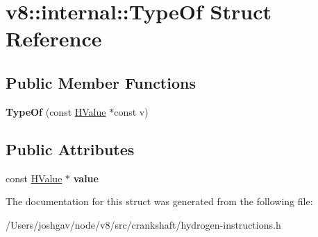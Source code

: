 \hypertarget{structv8_1_1internal_1_1_type_of}{}\section{v8\+:\+:internal\+:\+:Type\+Of Struct Reference}
\label{structv8_1_1internal_1_1_type_of}
\subsection*{Public Member Functions}
\begin{DoxyCompactItemize}
\item 
{\bfseries Type\+Of} (const \hyperlink{classv8_1_1internal_1_1_h_value}{H\+Value} $\ast$const v)\hypertarget{structv8_1_1internal_1_1_type_of_a1ba1a45c67d36246ba6075172ca12ee0}{}\label{structv8_1_1internal_1_1_type_of_a1ba1a45c67d36246ba6075172ca12ee0}

\end{DoxyCompactItemize}
\subsection*{Public Attributes}
\begin{DoxyCompactItemize}
\item 
const \hyperlink{classv8_1_1internal_1_1_h_value}{H\+Value} $\ast$ {\bfseries value}\hypertarget{structv8_1_1internal_1_1_type_of_a3bf697bc781ad937a03f038097352ba0}{}\label{structv8_1_1internal_1_1_type_of_a3bf697bc781ad937a03f038097352ba0}

\end{DoxyCompactItemize}


The documentation for this struct was generated from the following file\+:\begin{DoxyCompactItemize}
\item 
/\+Users/joshgav/node/v8/src/crankshaft/hydrogen-\/instructions.\+h\end{DoxyCompactItemize}
